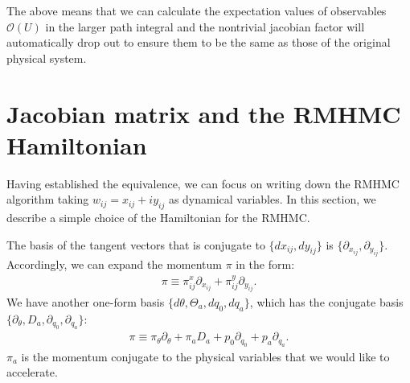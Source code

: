 \documentclass[12pt]{article}
\begin{document}
The above means that we can calculate the expectation values of
observables ${\mathcal O}(U)$ in the larger path integral
and the nontrivial jacobian factor will automatically drop out
to ensure them to be the same as those of the original physical system.



\section{Jacobian matrix and the RMHMC Hamiltonian}
\label{sec:rmhmc_hamil}

Having established the equivalence,
we can focus on writing down the
RMHMC algorithm taking
$w_{ij}=x_{ij}+iy_{ij}$ as dynamical variables.
In this section, we describe a simple
choice of the Hamiltonian for the RMHMC.

The basis of the tangent vectors
that is conjugate to $\{dx_{ij}, dy_{ij}\}$
is $\{\partial_{x_{ij}}, \partial_{y_{ij}} \}$.
Accordingly, we can expand the momentum $\pi$ in the form:
\begin{align}
  \pi
  \equiv
  \pi^x_{ij}\partial_{x_{ij}}
  +
  \pi^y_{ij}\partial_{y_{ij}}.
\end{align}
We have another one-form basis
$\{d\theta, \Theta_a, dq_0, dq_a\}$,
which has the conjugate basis
$\{\partial_\theta, D_a, \partial_{q_0}, \partial_{q_a} \}$:
\begin{align}
  \pi
  \equiv
  \pi_\theta \partial_{\theta}
  +
  \pi_a D_a
  +
  p_0 \partial_{q_0}
  +
  p_a \partial_{q_a}.
\end{align}
$\pi_a$ is the momentum conjugate to the physical variables
that we would like to accelerate.
\end{document}
